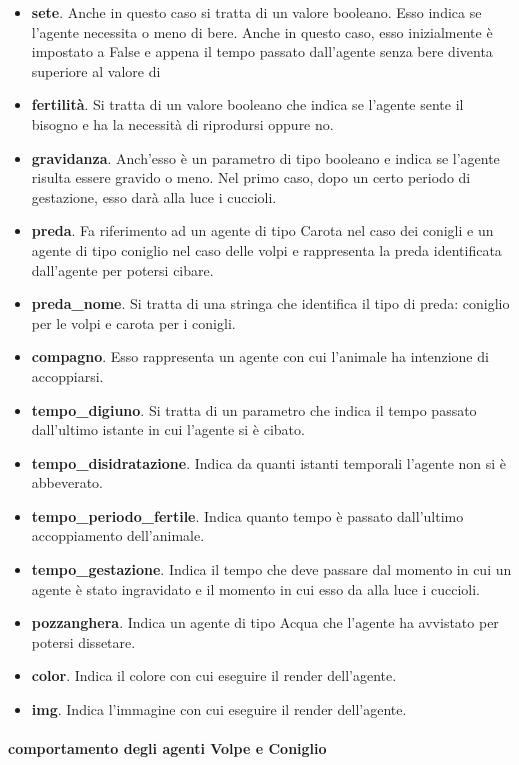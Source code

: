 \documentclass[11pt]{article}
\begin{document}
\begin{itemize}
    \item \textbf{sete}. Anche in questo caso si tratta di un valore booleano. Esso indica se l'agente necessita o meno di bere. Anche in questo caso, esso inizialmente è impostato a False e appena il tempo passato dall'agente senza bere diventa superiore al valore di 
    \item \textbf{fertilità}. Si tratta di un valore booleano che indica se l'agente sente il bisogno e ha la necessità di riprodursi oppure no. 
    \item \textbf{gravidanza}. Anch'esso è un parametro di tipo booleano e indica se l'agente risulta essere gravido o meno. Nel primo caso, dopo un certo periodo di gestazione, esso darà alla luce i cuccioli. 
    \item \textbf{preda}. Fa riferimento ad un agente di tipo Carota nel caso dei conigli e un agente di tipo coniglio nel caso delle volpi e rappresenta la preda identificata dall'agente per potersi cibare. 
    \item \textbf{preda\_nome}. Si tratta di una stringa che identifica il tipo di preda: coniglio per le volpi e carota per i conigli. 
    \item \textbf{compagno}. Esso rappresenta un agente con cui l'animale ha intenzione di accoppiarsi. 
    \item \textbf{tempo\_digiuno}. Si tratta di un parametro che indica il tempo passato dall'ultimo istante in cui l'agente si è cibato.
    \item \textbf{tempo\_disidratazione}. Indica da quanti istanti temporali l'agente non si è abbeverato.
    \item \textbf{tempo\_periodo\_fertile}. Indica quanto tempo è passato dall'ultimo accoppiamento dell'animale. 
    \item \textbf{tempo\_gestazione}. Indica il tempo che deve passare dal momento in cui un agente è stato ingravidato e il momento in cui esso da alla luce i cuccioli. 
    \item \textbf{pozzanghera}. Indica un agente di tipo Acqua che l'agente ha avvistato per potersi dissetare.
    \item \textbf{color}. Indica il colore con cui eseguire il render dell'agente.
    \item \textbf{img}. Indica l'immagine con cui eseguire il render dell'agente. 
\end{itemize}

\paragraph{comportamento degli agenti Volpe e Coniglio}
\end{document}
